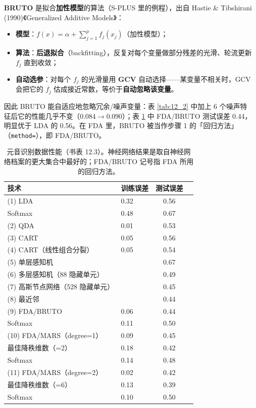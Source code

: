 \begin{remark}
\textbf{BRUTO} 是拟合\textbf{加性模型}的算法（S-PLUS 里的例程），出自 Hastie \& Tibshirani (1990)《Generalized Additive Models》：

\begin{itemize}
\item \textbf{模型}：$f(x)=\alpha+\sum_{j=1}^{p}f_j(x_j)$（加性模型）；
\item \textbf{算法}：\textbf{后退拟合}（backfitting），反复对每个变量做部分残差的光滑、轮流更新 $f_j$ 直到收敛；
\item \textbf{自动选参}：对每个 $f_j$ 的光滑量用 \textbf{GCV} 自动选择——某变量不相关时，GCV 会把它的 $f_j$ 估成接近常数，等价于\textbf{自动忽略该变量}。
\end{itemize}

因此 BRUTO 能自适应地忽略冗余/噪声变量：表 \ref{tab:12_2} 中加上 6 个噪声特征后它的性能几乎不变（0.084$\to$0.090）；表 \ref{tab:12_3} 中 FDA/BRUTO 测试误差 0.44，明显优于 LDA 的 0.56。在 FDA 里，BRUTO 被当作步骤 1 的「回归方法」（\texttt{method=}），即 FDA/BRUTO。
\end{remark}

\begin{table}[htbp]
\centering
\caption{元音识别数据性能（书表 12.3）。神经网络结果是取自神经网络档案的更大集合中最好的；FDA/BRUTO 记号指 FDA 所用的回归方法。}
\label{tab:12_3}
\begin{tabular}{llcc}
\toprule
技术 & 训练误差 & 测试误差 \\
\midrule
(1) LDA & 0.32 & 0.56 \\
\hspace{1em}Softmax & 0.48 & 0.67 \\
(2) QDA & 0.01 & 0.53 \\
(3) CART & 0.05 & 0.56 \\
(4) CART（线性组合分裂） & 0.05 & 0.54 \\
(5) 单层感知机 & & 0.67 \\
(6) 多层感知机（88 隐藏单元） & & 0.49 \\
(7) 高斯节点网络（528 隐藏单元） & & 0.45 \\
(8) 最近邻 & & 0.44 \\
(9) FDA/BRUTO & 0.06 & 0.44 \\
\hspace{1em}Softmax & 0.11 & 0.50 \\
(10) FDA/MARS（degree=1） & 0.09 & 0.45 \\
\hspace{1em}最佳降秩维数（=2） & 0.18 & 0.42 \\
\hspace{1em}Softmax & 0.14 & 0.48 \\
(11) FDA/MARS（degree=2） & 0.02 & 0.42 \\
\hspace{1em}最佳降秩维数（=6） & 0.13 & 0.39 \\
\hspace{1em}Softmax & 0.10 & 0.50 \\
\bottomrule
\end{tabular}
\end{table}

